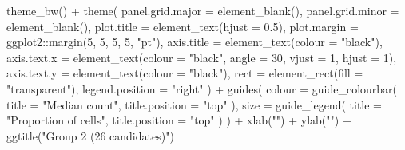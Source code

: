 \documentclass[
  11pt,
  oneside]{book}
\newenvironment{Shaded}{\begin{snugshade}}{\end{snugshade}}
\newcommand{\AttributeTok}[1]{\textcolor[rgb]{0.77,0.63,0.00}{#1}}
\newcommand{\DecValTok}[1]{\textcolor[rgb]{0.00,0.00,0.81}{#1}}
\newcommand{\FloatTok}[1]{\textcolor[rgb]{0.00,0.00,0.81}{#1}}
\newcommand{\FunctionTok}[1]{\textcolor[rgb]{0.00,0.00,0.00}{#1}}
\newcommand{\NormalTok}[1]{#1}
\newcommand{\SpecialCharTok}[1]{\textcolor[rgb]{0.00,0.00,0.00}{#1}}
\newcommand{\StringTok}[1]{\textcolor[rgb]{0.31,0.60,0.02}{#1}}
\begin{document}
\begin{Shaded}
\begin{Highlighting}[]
  \FunctionTok{theme\_bw}\NormalTok{() }\SpecialCharTok{+}
  \FunctionTok{theme}\NormalTok{(}
    \AttributeTok{panel.grid.major =} \FunctionTok{element\_blank}\NormalTok{(),}
    \AttributeTok{panel.grid.minor =} \FunctionTok{element\_blank}\NormalTok{(),}
    \AttributeTok{plot.title =} \FunctionTok{element\_text}\NormalTok{(}\AttributeTok{hjust =} \FloatTok{0.5}\NormalTok{),}
    \AttributeTok{plot.margin =}\NormalTok{ ggplot2}\SpecialCharTok{::}\FunctionTok{margin}\NormalTok{(}\DecValTok{5}\NormalTok{, }\DecValTok{5}\NormalTok{, }\DecValTok{5}\NormalTok{, }\DecValTok{5}\NormalTok{, }\StringTok{"pt"}\NormalTok{),}
    \AttributeTok{axis.title =} \FunctionTok{element\_text}\NormalTok{(}\AttributeTok{colour =} \StringTok{"black"}\NormalTok{),}
    \AttributeTok{axis.text.x =} \FunctionTok{element\_text}\NormalTok{(}\AttributeTok{colour =} \StringTok{"black"}\NormalTok{, }\AttributeTok{angle =} \DecValTok{30}\NormalTok{, }\AttributeTok{vjust =} \DecValTok{1}\NormalTok{, }\AttributeTok{hjust =} \DecValTok{1}\NormalTok{),}
    \AttributeTok{axis.text.y =} \FunctionTok{element\_text}\NormalTok{(}\AttributeTok{colour =} \StringTok{"black"}\NormalTok{),}
    \AttributeTok{rect =} \FunctionTok{element\_rect}\NormalTok{(}\AttributeTok{fill =} \StringTok{"transparent"}\NormalTok{),}
    \AttributeTok{legend.position =} \StringTok{"right"}
\NormalTok{  ) }\SpecialCharTok{+}
  \FunctionTok{guides}\NormalTok{(}
    \AttributeTok{colour =} \FunctionTok{guide\_colourbar}\NormalTok{(}
      \AttributeTok{title =} \StringTok{"Median count"}\NormalTok{,}
      \AttributeTok{title.position =} \StringTok{"top"}
\NormalTok{    ),}
    \AttributeTok{size =} \FunctionTok{guide\_legend}\NormalTok{(}
      \AttributeTok{title =} \StringTok{"Proportion of cells"}\NormalTok{,}
      \AttributeTok{title.position =} \StringTok{"top"}
\NormalTok{    )}
\NormalTok{  ) }\SpecialCharTok{+}
  \FunctionTok{xlab}\NormalTok{(}\StringTok{""}\NormalTok{) }\SpecialCharTok{+}
  \FunctionTok{ylab}\NormalTok{(}\StringTok{""}\NormalTok{) }\SpecialCharTok{+}
  \FunctionTok{ggtitle}\NormalTok{(}\StringTok{"Group 2 (26 candidates)"}\NormalTok{)}
\end{Highlighting}
\end{Shaded}
\end{document}
